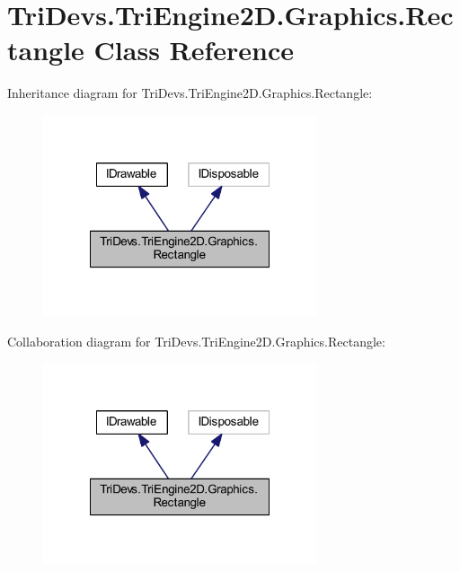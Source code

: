 \hypertarget{class_tri_devs_1_1_tri_engine2_d_1_1_graphics_1_1_rectangle}{\section{Tri\-Devs.\-Tri\-Engine2\-D.\-Graphics.\-Rectangle Class Reference}
\label{class_tri_devs_1_1_tri_engine2_d_1_1_graphics_1_1_rectangle}
}


Inheritance diagram for Tri\-Devs.\-Tri\-Engine2\-D.\-Graphics.\-Rectangle\-:
\nopagebreak
\begin{figure}[H]
\begin{center}
\leavevmode
\includegraphics[width=228pt]{class_tri_devs_1_1_tri_engine2_d_1_1_graphics_1_1_rectangle__inherit__graph}
\end{center}
\end{figure}


Collaboration diagram for Tri\-Devs.\-Tri\-Engine2\-D.\-Graphics.\-Rectangle\-:
\nopagebreak
\begin{figure}[H]
\begin{center}
\leavevmode
\includegraphics[width=228pt]{class_tri_devs_1_1_tri_engine2_d_1_1_graphics_1_1_rectangle__coll__graph}
\end{center}
\end{figure}

